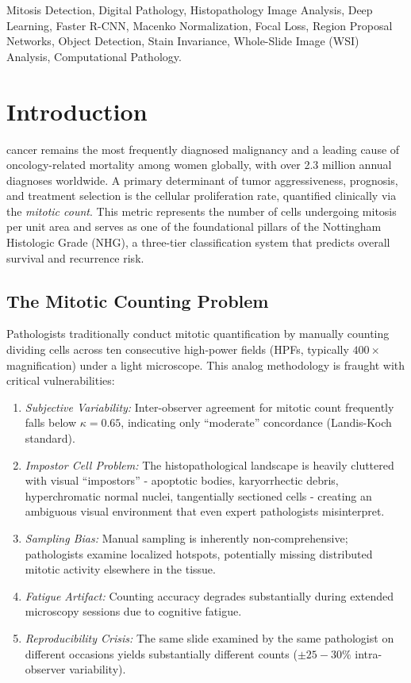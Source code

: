 \documentclass[journal]{IEEEtran}
\begin{document}
\begin{IEEEkeywords}
Mitosis Detection, Digital Pathology, Histopathology Image Analysis, Deep Learning, Faster R-CNN, Macenko Normalization, Focal Loss, Region Proposal Networks, Object Detection, Stain Invariance, Whole-Slide Image (WSI) Analysis, Computational Pathology.
\end{IEEEkeywords}

\section{Introduction}
 cancer remains the most frequently diagnosed malignancy and a leading cause of oncology-related mortality among women globally, with over 2.3 million annual diagnoses worldwide. A primary determinant of tumor aggressiveness, prognosis, and treatment selection is the cellular proliferation rate, quantified clinically via the \textit{mitotic count}. This metric represents the number of cells undergoing mitosis per unit area and serves as one of the foundational pillars of the Nottingham Histologic Grade (NHG), a three-tier classification system that predicts overall survival and recurrence risk.

\subsection{The Mitotic Counting Problem}
Pathologists traditionally conduct mitotic quantification by manually counting dividing cells across ten consecutive high-power fields (HPFs, typically $400 \times$ magnification) under a light microscope. This analog methodology is fraught with critical vulnerabilities:

\begin{enumerate}
\item \textit{Subjective Variability:} Inter-observer agreement for mitotic count frequently falls below $\kappa = 0.65$, indicating only ``moderate'' concordance (Landis-Koch standard).

\item \textit{Impostor Cell Problem:} The histopathological landscape is heavily cluttered with visual ``impostors'' - apoptotic bodies, karyorrhectic debris, hyperchromatic normal nuclei, tangentially sectioned cells - creating an ambiguous visual environment that even expert pathologists misinterpret.

\item \textit{Sampling Bias:} Manual sampling is inherently non-comprehensive; pathologists examine localized hotspots, potentially missing distributed mitotic activity elsewhere in the tissue.

\item \textit{Fatigue Artifact:} Counting accuracy degrades substantially during extended microscopy sessions due to cognitive fatigue.

\item \textit{Reproducibility Crisis:} The same slide examined by the same pathologist on different occasions yields substantially different counts ($\pm 25-30\%$ intra-observer variability).
\end{enumerate}
\end{document}
